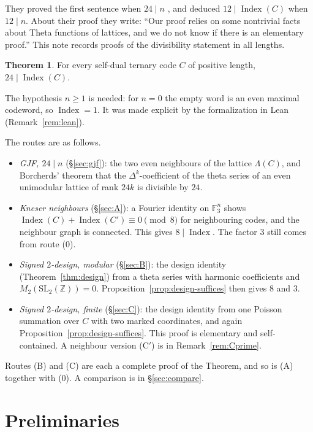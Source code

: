 \documentclass[11pt]{amsart}
\theoremstyle{definition}
\newtheorem*{mainthm}{Theorem}
\newcommand{\F}{\mathbb{F}_3}
\newcommand{\Z}{\mathbb{Z}}
\newcommand{\Index}{\operatorname{Index}}
\begin{document}
They proved the first sentence when $24\mid n$ \cite[Thm.~1.3]{GJF}, and deduced $12\mid\Index(C)$
when $12\mid n$. About their proof they write: ``Our proof relies on some nontrivial facts about Theta
functions of lattices, and we do not know if there is an elementary proof.'' This note records
proofs of the divisibility statement in all lengths.

\begin{mainthm}
For every self-dual ternary code $C$ of positive length, $24\mid\Index(C)$.
\end{mainthm}

The hypothesis $n\ge1$ is needed: for $n=0$ the empty word is an even maximal codeword, so
$\Index=1$. It was made explicit by the formalization in Lean (Remark~\ref{rem:lean}).

The routes are as follows.
\begin{itemize}
\item[(0)] \emph{GJF, $24\mid n$} (\S\ref{sec:gjf}): the two even neighbours of the lattice $\Lambda(C)$,
  and Borcherds' theorem that the $\Delta^{k}$-coefficient of the theta series of an even unimodular
  lattice of rank $24k$ is divisible by $24$.
\item[(A)] \emph{Kneser neighbours} (\S\ref{sec:A}): a Fourier identity on $\F^n$ shows
  $\Index(C)+\Index(C')\equiv0\pmod8$ for neighbouring codes, and the neighbour graph is connected.
  This gives $8\mid\Index$. The factor $3$ still comes from route (0).
\item[(B)] \emph{Signed $2$-design, modular} (\S\ref{sec:B}): the design identity
  (Theorem~\ref{thm:design}) from a theta series with harmonic coefficients and
  $M_2(\mathrm{SL}_2(\Z))=0$. Proposition~\ref{prop:design-suffices} then gives $8$ and $3$.
\item[(C)] \emph{Signed $2$-design, finite} (\S\ref{sec:C}): the design identity from one Poisson
  summation over $C$ with two marked coordinates, and again Proposition~\ref{prop:design-suffices}.
  This proof is elementary and self-contained. A neighbour version (C$'$) is in
  Remark~\ref{rem:Cprime}.
\end{itemize}
Routes (B) and (C) are each a complete proof of the Theorem, and so is (A) together with (0). A
comparison is in \S\ref{sec:compare}.

\section{Preliminaries}\label{sec:prelim}
\end{document}
